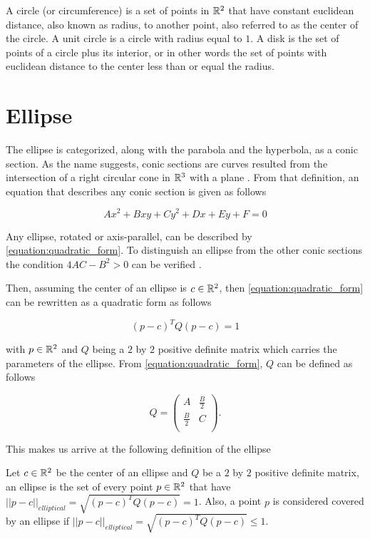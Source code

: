 A circle (or circumference) is a set of points in $\mathbb{R}^2$ that have constant euclidean distance, also known as radius, to another point, also referred to as the center of the circle. A unit circle is a circle with radius equal to $1$.
A disk is the set of points of a circle plus its interior, or in other words the set of points with euclidean distance to the center less than or equal the radius.


\section{Ellipse}

The ellipse is categorized, along with the parabola and the hyperbola, as a conic section. As the name suggests, conic sections are curves resulted from the intersection of a right circular cone in $\mathbb{R}^3$ with a plane \cite{brannan:geometry}. From that definition, an equation that describes any conic section is given as follows

\begin{equation}\label{equation:quadratic_form}
Ax^2 + Bxy + Cy^2 + Dx + Ey + F = 0
\end{equation}

Any ellipse, rotated or axis-parallel, can be described by \autoref{equation:quadratic_form}. To distinguish an ellipse from the other conic sections the condition $4AC - B^2>0$ can be verified \cite{ayoub}.

Then, assuming the center of an ellipse is $c \in \mathbb{R}^2$, then \autoref{equation:quadratic_form} can be rewritten as a quadratic form as follows

\begin{equation}
(p-c)^{T}Q(p-c) = 1
\end{equation}

with $p \in \mathbb{R}^2$ and $Q$ being a $2$ by $2$ positive definite matrix which carries the parameters of the ellipse. From \autoref{equation:quadratic_form}, $Q$ can be defined as follows

\[
Q=
\left( {\begin{array}{cc}
	A & \frac{B}{2} \\
	\frac{B}{2} & C \\
	\end{array} } \right).
\]

This makes us arrive at the following definition of the ellipse

\begin{definicao}\label{def:ellipse}
    Let $c\in \mathbb{R}^2$ be the center of an ellipse and $Q$ be a $2$ by $2$ positive definite matrix, an ellipse is the set of every point $p \in \mathbb{R}^2$ that have $||p-c||_{elliptical} = \sqrt{(p-c)^{T}Q(p-c)} = 1$. Also, a point $p$ is considered covered by an ellipse if $||p-c||_{elliptical} = \sqrt{(p-c)^{T}Q(p-c)} \le 1$.
\end{definicao}

